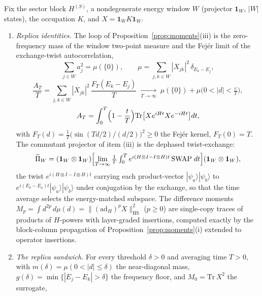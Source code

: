 \begin{proposition}\label{prop:replica}
Fix the sector block $H^{(S)}$, a nondegenerate energy window $W$
(projector $\mathbf{1}_W$, $|W|$ states), the occupation $K$, and
$X=\mathbf{1}_WK\mathbf{1}_W$.
\begin{enumerate}[leftmargin=1.6em]
\item \emph{Replica identities.} The loop of
Proposition~\ref{prop:moments}(iii) is the zero-frequency mass of the
window two-point measure and the Fej\'er limit of the exchange-twist
autocorrelation,
\begin{equation*}
\sum_{j\in W}a_j^{2}=\mu(\{0\}),\qquad
\mu=\sum_{j,k\in W}|X_{jk}|^{2}\,\delta_{E_k-E_j},
\end{equation*}
\begin{equation*}
\frac{A_T}{T}=\sum_{j,k\in W}|X_{jk}|^{2}\,
\frac{F_T(E_k-E_j)}{T}\;\xrightarrow[T\to\infty]{}\;\mu(\{0\})
+ \mu\bigl(0<|d|<\tfrac{c}{T}\bigr),
\end{equation*}
\begin{equation*}
A_T=\int_0^T\Bigl(1-\frac{t}{T}\Bigr)
\mathrm{Tr}\bigl[Xe^{iHt}Xe^{-iHt}\bigr]dt,
\end{equation*}
with $F_T(d)=\tfrac{1}{T}\bigl(\sin(Td/2)/(d/2)\bigr)^{2}\ge0$ the
Fej\'er kernel, $F_T(0)=T$.  The commutant projector of item (iii) is the
dephased twist-exchange:
\begin{equation*}
\widetilde{\Pi}_W=(\mathbf{1}_W\otimes\mathbf{1}_W)
\Bigl[\lim_{T\to\infty}\tfrac{1}{T}\textstyle\int_0^T
e^{i(H\otimes I-I\otimes H)t}\,\mathrm{SWAP}\;dt\Bigr]
(\mathbf{1}_W\otimes\mathbf{1}_W),
\end{equation*}
the twist $e^{i(H\otimes I-I\otimes H)t}$ carrying each product-vector
$|\psi_a\rangle|\psi_b\rangle$ to $e^{i(E_b-E_a)t}|\psi_a\rangle|\psi_b
\rangle$ under conjugation by the exchange, so that the time average
selects the energy-matched subspace.  The difference moments
$M_p=\int d^{2p}\,d\mu(d)=\|(\mathrm{ad}_H)^{p}X\|^{2}_{\mathrm{HS}}$
($p\ge0$) are single-copy traces of products of $H$-powers with
layer-graded insertions, computed exactly by the block-column propagation
of Proposition~\ref{prop:moments}(i) extended to operator insertions.
\item \emph{The replica sandwich.} For every threshold $\delta>0$ and
averaging time $T>0$, with $m(\delta)=\mu(0<|d|\le\delta)$ the
near-diagonal mass, $g(\delta)=\min\{|E_j-E_k|>\delta\}$ the frequency
floor, and $M_0=\mathrm{Tr}\,X^{2}$ the surrogate,
\begin{equation*}

\end{equation*}
\end{enumerate}
\end{proposition}

